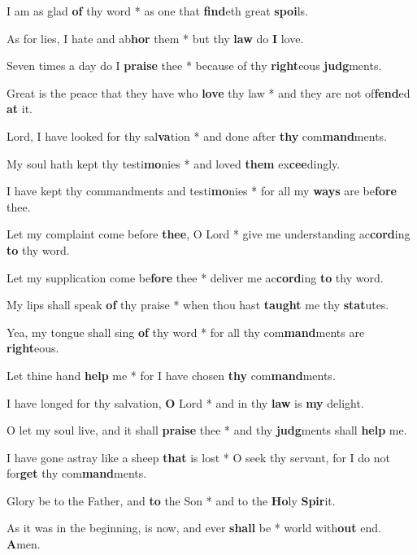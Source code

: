 \begin{multicols}{2}
	I am as glad \textbf{of} thy word * as one that \textbf{find}eth great \textbf{spoi}ls.
	
	As for lies, I hate and ab\textbf{hor} them * but thy \textbf{law} do \textbf{I} love.
	
	Seven times a day do I \textbf{praise} thee * because of thy \textbf{right}eous \textbf{judg}ments.
	
	Great is the peace that they have who \textbf{love} thy law * and they are not of\textbf{fend}ed \textbf{at} it.
	
	Lord, I have looked for thy sal\textbf{va}tion * and done after \textbf{thy} com\textbf{mand}ments.
	
	My soul hath kept thy testi\textbf{mo}nies * and loved \textbf{them} ex\textbf{cee}dingly.
	
	I have kept thy commandments and testi\textbf{mo}nies * for all my \textbf{ways} are be\textbf{fore} thee.
	
	Let my complaint come before \textbf{thee}, O Lord * give me understanding ac\textbf{cord}ing \textbf{to} thy word.
	
	Let my supplication come be\textbf{fore} thee * deliver me ac\textbf{cord}ing \textbf{to} thy word.
	
	My lips shall speak \textbf{of} thy praise * when thou hast \textbf{taught} me thy \textbf{stat}utes.
	
	Yea, my tongue shall sing \textbf{of} thy word * for all thy com\textbf{mand}ments are \textbf{right}eous.
	
	Let thine hand \textbf{help} me * for I have chosen \textbf{thy} com\textbf{mand}ments.
	
	I have longed for thy salvation, \textbf{O} Lord * and in thy \textbf{law} is \textbf{my} delight.
	
	O let my soul live, and it shall \textbf{praise} thee * and thy \textbf{judg}ments shall \textbf{help} me.
	
	I have gone astray like a sheep \textbf{that} is lost * O seek thy servant, for I do not for\textbf{get} thy com\textbf{mand}ments.
	
	Glory be to the Father, and \textbf{to} the Son * and to the \textbf{Ho}ly \textbf{Spir}it.
	
	As it was in the beginning, is now, and ever \textbf{shall} be * world with\textbf{out} end. \textbf{A}men.
\end{multicols}
